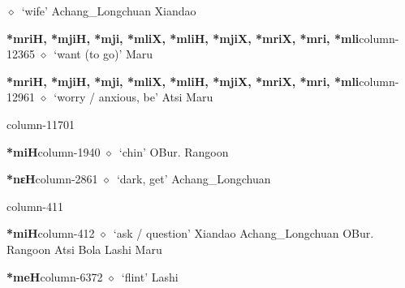          $\diamond$~`wife'
         Achang\_Longchuan 
\hspace{1ex}
         Xiandao 
  \item {\footnotesize \textbf{*mriH, *mjiH, *mji, *mliX, *mliH, *mjiX, *mriX, *mri, *mli}}{\tiny column-12365}
         $\diamond$~`want (to go)'
         Maru 
  \item {\footnotesize \textbf{*mriH, *mjiH, *mji, *mliX, *mliH, *mjiX, *mriX, *mri, *mli}}{\tiny column-12961}
         $\diamond$~`worry / anxious, be'
         Atsi 
\hspace{1ex}
         Maru 
  \item {\footnotesize \textbf{}}{\tiny column-11701}
  \item {\footnotesize \textbf{*miH}}{\tiny column-1940}
         $\diamond$~`chin'
         OBur. 
\hspace{1ex}
         Rangoon 
  \item {\footnotesize \textbf{*nɛH}}{\tiny column-2861}
         $\diamond$~`dark, get'
         Achang\_Longchuan 
  \item {\footnotesize \textbf{}}{\tiny column-411}
  \item {\footnotesize \textbf{*miH}}{\tiny column-412}
         $\diamond$~`ask / question'
         Xiandao 
\hspace{1ex}
         Achang\_Longchuan 
\hspace{1ex}
         OBur. 
\hspace{1ex}
         Rangoon 
\hspace{1ex}
         Atsi 
\hspace{1ex}
         Bola 
\hspace{1ex}
         Lashi 
\hspace{1ex}
         Maru 
  \item {\footnotesize \textbf{*meH}}{\tiny column-6372}
         $\diamond$~`flint'
         Lashi 
\hspace{1ex}
